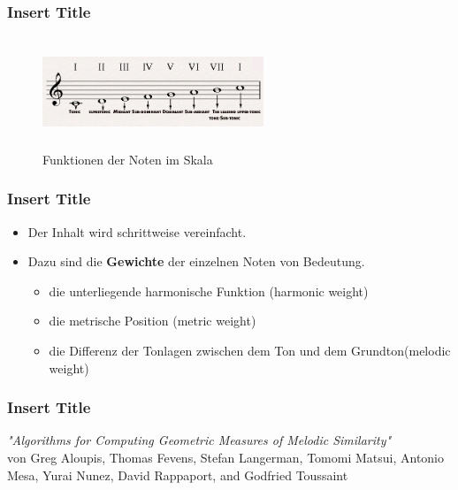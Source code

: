 \documentclass{beamer}
\begin{document}
	\begin{frame}
		\frametitle{Insert Title}
		\begin{figure}[h!]
			\includegraphics[width=250px,height=125px,keepaspectratio]{functional_degrees}
			\caption{Funktionen der Noten im Skala \cite{functional_degrees_source}} 
		\end{figure}
	\end{frame}


	\begin{frame}
		\frametitle{Insert Title}
		\begin{itemize}
				\item Der Inhalt wird schrittweise vereinfacht.
				\item Dazu sind die \textbf{Gewichte} der einzelnen Noten von Bedeutung.
					\begin{itemize}
						\item die unterliegende harmonische Funktion (harmonic weight)
						\item die metrische Position (metric weight)
						\item die Differenz der Tonlagen zwischen dem Ton und dem Grundton(melodic weight)
					\end{itemize}
		\end{itemize}
	\end{frame}
	
    \begin{frame}
		\frametitle{Insert Title }
		\begin{minipage}{0.45\textwidth}
			\begin{center}
				\textit{"Algorithms for Computing Geometric Measures of Melodic Similarity"} 
				\cite{one}  \\ 
				von Greg Aloupis, Thomas Fevens, Stefan Langerman, Tomomi Matsui, Antonio Mesa, Yurai Nunez, David Rappaport, and Godfried Toussaint
			\end{center}
		\end{minipage}%
		\begin{minipage}{0.45\textwidth}
			\begin{figure}[h!]
			\end{figure}
		\end{minipage}
	\end{frame}
	
\end{document}
